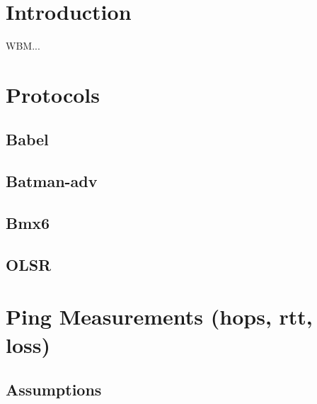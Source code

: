 \documentclass[a4paper,12pt,twoside]{article}
\begin{document}
\section{Introduction}
\label{sec:introduction}


WBM...

\section{Protocols}


\subsection{Babel}

\subsection{Batman-adv}

\subsection{Bmx6}

\subsection{OLSR}




\section{Ping Measurements (hops, rtt, loss)}
\label{sec:ping-measurements}

\subsection{Assumptions}
\end{document}
